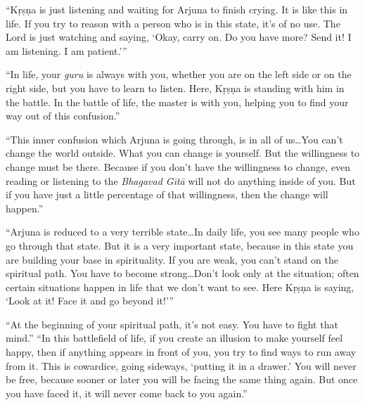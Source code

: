 \enquote{Kṛṣṇa is just listening and waiting for Arjuna to finish crying. It is like this in life. If you try to reason with a person who is in this state, it’s of no use. The Lord is just watching and saying, \enquote{Okay, carry on. Do you have more? Send it! I am listening. I am patient.}}

\enquote{In life, your \textit{guru} is always with you, whether you are on the left side or on the right side, but you have to learn to listen. Here, Kṛṣṇa is standing with him in the battle. In the battle of life, the master is with you, helping you to find your way out of this confusion.}

\enquote{This inner confusion which Arjuna is going through, is in all of us\ldots You can’t change the world outside. What you can change is yourself. But the willingness to change must be there. Because if you don’t have the willingness to change, even reading or listening to the \textit{Bhagavad Gītā} will not do anything inside of you. But if you have just a little percentage of that willingness, then the change will happen.}

\enquote{Arjuna is reduced to a very terrible state\ldots In daily life, you see many people who go through that state. But it is a very important state, because in this state you are building your base in spirituality. If you are weak, you can’t stand on the spiritual path. You have to become strong\ldots Don’t look only at the situation; often certain situations happen in life that we don’t want to see. Here Kṛṣṇa is saying, \enquote{Look at it! Face it and go beyond it!}}

\enquote{At the beginning of your spiritual path, it’s not easy. You have to fight that mind.}
\enquote{In this battlefield of life, if you create an illusion to make yourself feel happy, then if anything appears in front of you, you try to find ways to run away from it. This is cowardice, going sideways, \enquote{putting it in a drawer.} You will never be free, because sooner or later you will be facing the same thing again. But once you have faced it, it will never come back to you again.}
